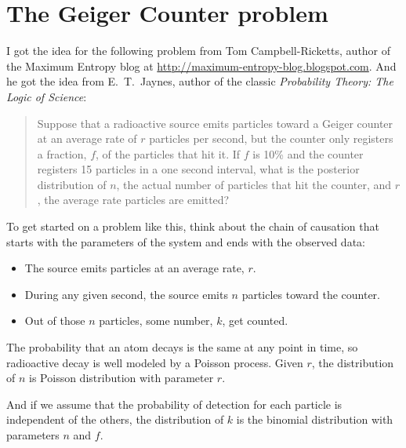 \documentclass[12pt]{book}
\begin{document}
\section{The Geiger Counter problem}

I got the idea for the following problem from Tom Campbell-Ricketts,
author of the Maximum Entropy blog at
\url{http://maximum-entropy-blog.blogspot.com}.  And he got the idea
from E.~T.~Jaynes, author of the classic {\em Probability Theory: The
  Logic of Science}:

\begin{quote}
Suppose that a radioactive source emits particles toward
a Geiger counter at an average rate of $r$ particles per second,
but the counter only registers a fraction, $f$, of the particles
that hit it.  If $f$ is 10\% and
the counter registers 15 particles in a one second
interval, what is the posterior distribution of $n$, the actual
number of particles that hit the counter, and $r$, the average
rate particles are emitted?
\end{quote}

To get started on a problem like this, think about the chain of
causation that starts with the parameters of the system and ends
with the observed data:

\begin{itemize}

\item The source emits particles at an average rate, $r$.

\item During any given second, the source emits $n$ particles
toward the counter.

\item Out of those $n$ particles, some number, $k$, get counted.

\end{itemize}

The probability that an atom decays is the same at any point in time,
so radioactive decay is well modeled by a Poisson process.  Given $r$,
the distribution of $n$ is Poisson distribution with parameter $r$.

And if we assume that the probability of detection for each particle
is independent of the others, the distribution of $k$ is the binomial
distribution with parameters $n$ and $f$.
\end{document}
